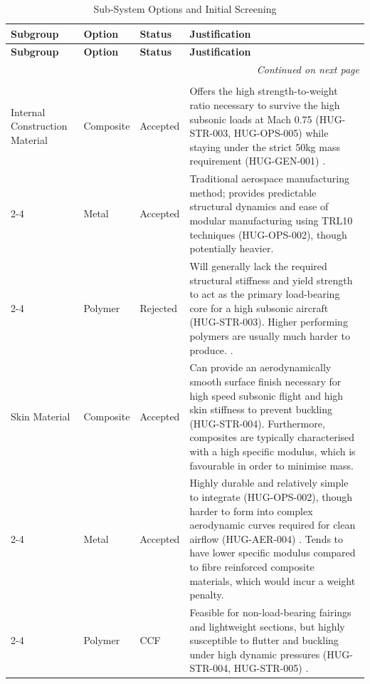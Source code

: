 \begin{longtable}{|p{1.6cm}|p{2.3cm}|p{1.6cm}|p{9.5cm}|}
\caption{Sub-System Options and Initial Screening} \label{tab:subsystem_screening} \\
\hline
\textbf{Subgroup} & \textbf{Option} & \textbf{Status} & \textbf{Justification} \\
\hline
\endfirsthead
\hline
\textbf{Subgroup} & \textbf{Option} & \textbf{Status} & \textbf{Justification} \\
\hline
\endhead
\hline
\multicolumn{4}{r}{\textit{Continued on next page}} \\
\endfoot
\hline
\endlastfoot

\multicolumn{4}{|c|}{\textbf{Fuselage Group}} \\
\hline
Internal Construction Material & Composite & Accepted & Offers the high strength-to-weight ratio necessary to survive the high subsonic loads at Mach 0.75 (HUG-STR-003, HUG-OPS-005) while staying under the strict 50kg mass requirement (HUG-GEN-001) \cite{raymer1992aircraft}. \\
\cline{2-4}
\multicolumn{1}{|l|}{} & Metal & Accepted & Traditional aerospace manufacturing method; provides predictable structural dynamics and ease of modular manufacturing using TRL10 techniques (HUG-OPS-002), though potentially heavier. \\
\cline{2-4}
\multicolumn{1}{|l|}{} & Polymer & Rejected & Will generally lack the required structural stiffness and yield strength to act as the primary load-bearing core for a high subsonic aircraft (HUG-STR-003). Higher performing polymers are usually much harder to produce. \cite{raymer1992aircraft}. \\
\hline
Skin Material & Composite & Accepted & Can provide an aerodynamically smooth surface finish necessary for high speed subsonic flight and high skin stiffness to prevent buckling (HUG-STR-004). Furthermore, composites are typically characterised with a high specific modulus, which is favourable in order to minimise mass.\\
\cline{2-4}
\multicolumn{1}{|l|}{} & Metal & Accepted & Highly durable and relatively simple to integrate (HUG-OPS-002), though harder to form into complex aerodynamic curves required for clean airflow (HUG-AER-004) \cite{raymer1992aircraft, Vos}. Tends to have lower specific modulus compared to fibre reinforced composite materials, which would incur a weight penalty. \\
\cline{2-4}
\multicolumn{1}{|l|}{} & Polymer & CCF & Feasible for non-load-bearing fairings and lightweight sections, but highly susceptible to flutter and buckling under high dynamic pressures (HUG-STR-004, HUG-STR-005) \cite{raymer1992aircraft}. \\

\end{longtable}
